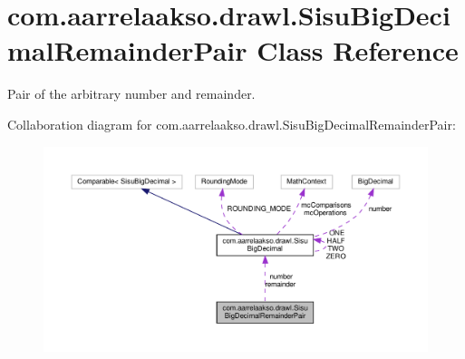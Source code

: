 \hypertarget{classcom_1_1aarrelaakso_1_1drawl_1_1_sisu_big_decimal_remainder_pair}{}\section{com.\+aarrelaakso.\+drawl.\+Sisu\+Big\+Decimal\+Remainder\+Pair Class Reference}
\label{classcom_1_1aarrelaakso_1_1drawl_1_1_sisu_big_decimal_remainder_pair}


Pair of the arbitrary number and remainder.  




Collaboration diagram for com.\+aarrelaakso.\+drawl.\+Sisu\+Big\+Decimal\+Remainder\+Pair\+:\nopagebreak
\begin{figure}[H]
\begin{center}
\leavevmode
\includegraphics[width=350pt]{d8/d6a/classcom_1_1aarrelaakso_1_1drawl_1_1_sisu_big_decimal_remainder_pair__coll__graph}
\end{center}
\end{figure}
